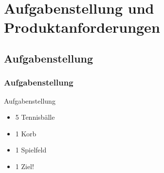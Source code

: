 \section{Aufgabenstellung und Produktanforderungen} %
\subsection{Aufgabenstellung}
\begin{frame}
    \frametitle{Aufgabenstellung}
	\begin{block}{Aufgabenstellung}
	    \begin{itemize}
	    	\item 5 Tennisbälle
	    	\item 1 Korb
		    \item 1 Spielfeld
		    \item 1 Ziel!
	    \end{itemize}
    \end{block}
\end{frame}
